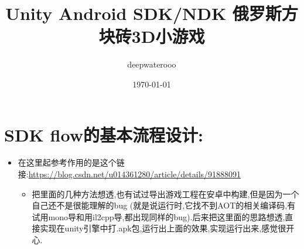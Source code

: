 \documentclass[9pt, b5paper]{article}
\author{deepwaterooo}
\date{\today}
\title{Unity Android SDK/NDK 俄罗斯方块砖3D小游戏}
\begin{document}
\maketitle
\tableofcontents


\section{SDK flow的基本流程设计:}
\label{sec-1}
\begin{itemize}
\item 在这里起参考作用的是这个链接:\url{https://blog.csdn.net/u014361280/article/details/91888091}
\begin{itemize}
\item 把里面的几种方法想透,也有试过导出游戏工程在安卓中构建,但是因为一个自己还不是很能理解的bug (就是说运行时,它找不到AOT的相关编译码,有试用mono导和用il2cpp导,都出现同样的bug).后来把这里面的思路想透,直接实现在unity引擎中打.apk包,运行出上面的效果,实现运行出来,感觉很开心.
\end{itemize}
\end{itemize}
\end{document}
